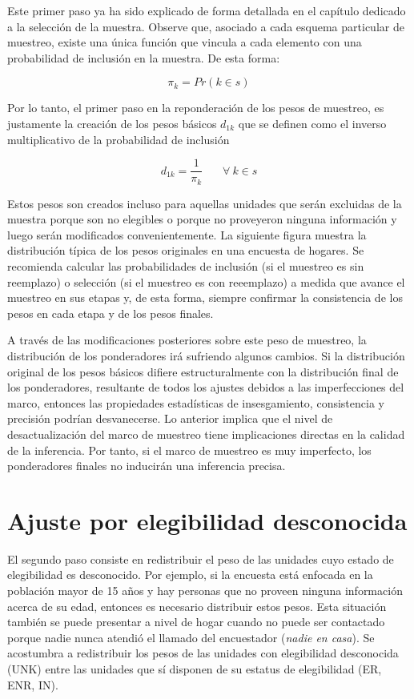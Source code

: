 \documentclass[
  12pt,
]{book}
\begin{document}
Este primer paso ya ha sido explicado de forma detallada en el capítulo dedicado a la selección de la muestra. Observe que, asociado a cada esquema particular de muestreo, existe una única función que vincula a cada elemento con una probabilidad de inclusión en la muestra. De esta forma:

\[\pi_k = Pr (k \in s)\]

Por lo tanto, el primer paso en la reponderación de los pesos de muestreo, es justamente la creación de los pesos básicos \(d_{1k}\) que se definen como el inverso multiplicativo de la probabilidad de inclusión

\[d_{1k} = \frac{1}{\pi_k}  \ \ \ \ \ \ \ \ \forall \ k\in s\]

Estos pesos son creados incluso para aquellas unidades que serán excluidas de la muestra porque son no elegibles o porque no proveyeron ninguna información y luego serán modificados convenientemente. La siguiente figura muestra la distribución típica de los pesos originales en una encuesta de hogares. Se recomienda calcular las probabilidades de inclusión (si el muestreo es sin reemplazo) o selección (si el muestreo es con reeemplazo) a medida que avance el muestreo en sus etapas y, de esta forma, siempre confirmar la consistencia de los pesos en cada etapa y de los pesos finales.

A través de las modificaciones posteriores sobre este peso de muestreo, la distribución de los ponderadores irá sufriendo algunos cambios. Si la distribución original de los pesos básicos difiere estructuralmente con la distribución final de los ponderadores, resultante de todos los ajustes debidos a las imperfecciones del marco, entonces las propiedades estadísticas de insesgamiento, consistencia y precisión podrían desvanecerse. Lo anterior implica que el nivel de desactualización del marco de muestreo tiene implicaciones directas en la calidad de la inferencia. Por tanto, si el marco de muestreo es muy imperfecto, los ponderadores finales no inducirán una inferencia precisa.

\hypertarget{ajuste-por-elegibilidad-desconocida}{%
\section{Ajuste por elegibilidad desconocida}\label{ajuste-por-elegibilidad-desconocida}}

El segundo paso consiste en redistribuir el peso de las unidades cuyo estado de elegibilidad es desconocido. Por ejemplo, si la encuesta está enfocada en la población mayor de 15 años y hay personas que no proveen ninguna información acerca de su edad, entonces es necesario distribuir estos pesos. Esta situación también se puede presentar a nivel de hogar cuando no puede ser contactado porque nadie nunca atendió el llamado del encuestador (\emph{nadie en casa}). Se acostumbra a redistribuir los pesos de las unidades con elegibilidad desconocida (UNK) entre las unidades que sí disponen de su estatus de elegibilidad (ER, ENR, IN).
\end{document}
